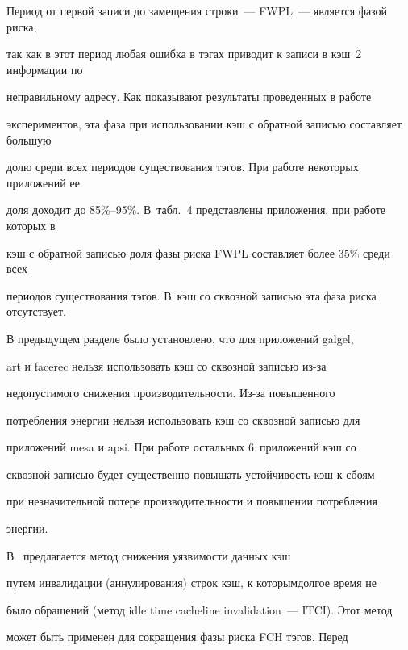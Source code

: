        Период от первой записи до  замещения строки~--- FWPL~--- является фазой риска, 


так как в этот период любая ошибка в тэгах приводит к записи в кэш~2  информации по 


неправильному адресу.  Как показывают результаты проведенных в работе~\cite{1-5} 


экспериментов, эта фаза при использовании кэш с обратной записью составляет большую 


долю среди всех периодов существования тэгов. При работе некоторых приложений ее 


доля доходит до 85\%--95\%.  В~табл.~4 представлены  приложения, при работе которых в 


кэш с обратной записью доля фазы риска FWPL составляет более 35\% среди всех 


периодов существования тэгов. В~кэш со сквозной записью эта фаза риска отсутствует. 














      В предыдущем разделе было установлено, что для  приложений galgel, 


art и facerec нельзя использовать кэш  со сквозной записью из-за 


недопустимого снижения производительности. Из-за повышенного 


потребления энергии  нельзя использовать кэш  со сквозной записью для 


приложений mesa и apsi. При работе остальных 6~приложений кэш со 


сквозной записью будет существенно повышать устойчивость кэш к сбоям 


при незначительной потере производительности и повышении потребления 


энергии.  


      


      В~\cite{5-5} предлагается метод снижения уязвимости данных кэш 


путем инвалидации (аннулирования) строк кэш, к которым\linebreak долгое время не 


было обращений (метод idle time cacheline invalidation~--- ITCI).  Этот метод 


может быть применен  для сокращения фазы риска FCH тэгов. Перед  


